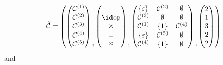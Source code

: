\[
    \spec{C} = \left(
    \begin{pmatrix}
        \mathcal{C}^{(1)}\\\mathcal{C}^{(2)}\\\mathcal{C}^{(3)}\\\mathcal{C}^{(4)}\\\mathcal{C}^{(5)}    
    \end{pmatrix}
    \begin{matrix}\\ \\ \\ \\,\end{matrix}
    \begin{pmatrix}
        \sqcup\\
        \idop\\
        \times\\
        \sqcup\\
        \times
    \end{pmatrix}
    \begin{matrix}\\ \\ \\ \\,\end{matrix}
    \begin{pmatrix}
        \set{\varepsilon} & \mathcal{C}^{(2)} & \emptyset\\
        \mathcal{C}^{(3)} & \emptyset & \emptyset\\
        \mathcal{C}^{(1)} & \set{1} & \mathcal{C}^{(4)}\\
        \set{\varepsilon} & \mathcal{C}^{(5)}  & \emptyset\\
        \mathcal{C}^{(4)} & \set{1} & \emptyset
    \end{pmatrix}
    \begin{matrix}\\ \\ \\ \\,\end{matrix}
    \begin{pmatrix}
        2\\1\\3\\2\\2
    \end{pmatrix}
    \right)
\]
and
